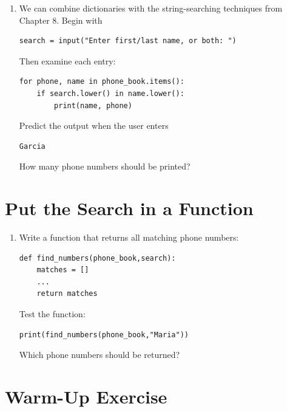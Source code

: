 \documentclass{article}
\begin{document}
\begin{enumerate}

\item We can combine dictionaries with the string-searching
techniques from Chapter 8.  Begin with

\begin{verbatim}
search = input("Enter first/last name, or both: ")
\end{verbatim}

Then examine each entry:

\begin{verbatim}
for phone, name in phone_book.items():
    if search.lower() in name.lower():
        print(name, phone)
\end{verbatim}

Predict the output when the user enters

\begin{verbatim}
Garcia
\end{verbatim}

How many phone numbers should be printed?

\end{enumerate}


\section{Put the Search in a Function}

\begin{enumerate}

\item Write a function that returns all matching phone numbers:

\begin{verbatim}
def find_numbers(phone_book,search):
    matches = []
    ...
    return matches
\end{verbatim}

Test the function:

\begin{verbatim}
print(find_numbers(phone_book,"Maria"))
\end{verbatim}

Which phone numbers should be returned?

\end{enumerate}


\section{Warm-Up Exercise}
\end{document}

